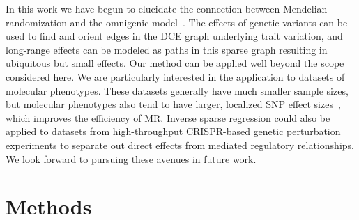 \documentclass{article}
\begin{document}
In this work we have begun to elucidate the connection between Mendelian randomization
and the omnigenic model~\cite{Boyle2017}. The effects of genetic variants
can be used to find and orient edges
in the DCE graph underlying trait variation, and long-range effects can be modeled
as paths in this sparse graph resulting in ubiquitous but small effects.
 Our method can be applied well beyond the scope considered
here. We are particularly interested in the application to datasets of molecular phenotypes.
These datasets generally have much smaller sample sizes, but molecular phenotypes also
tend to have larger, localized SNP effect sizes~\cite{gtex2017}, which improves the efficiency
of MR. Inverse sparse regression could also be applied to datasets from high-throughput CRISPR-based
genetic perturbation experiments to separate out direct effects from mediated regulatory relationships.
We look forward to pursuing these avenues in future work.

\section{Methods}\label{methods}
\end{document}
